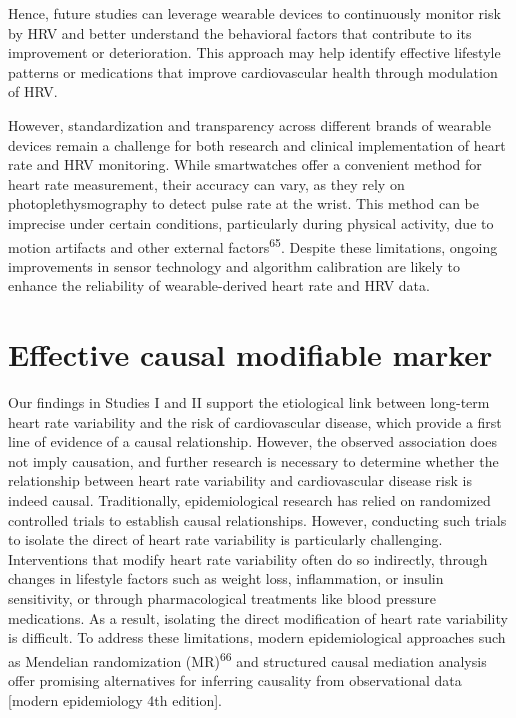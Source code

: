 \documentclass[
  a4paper,
  headsepline=true,
  open=any]{scrbook}
\begin{document}
Hence, future studies can leverage wearable devices to continuously
monitor risk by HRV and better understand the behavioral factors that
contribute to its improvement or deterioration. This approach may help
identify effective lifestyle patterns or medications that improve
cardiovascular health through modulation of HRV.

However, standardization and transparency across different brands of
wearable devices remain a challenge for both research and clinical
implementation of heart rate and HRV monitoring. While smartwatches
offer a convenient method for heart rate measurement, their accuracy can
vary, as they rely on photoplethysmography to detect pulse rate at the
wrist. This method can be imprecise under certain conditions,
particularly during physical activity, due to motion artifacts and other
external factors\textsuperscript{65}. Despite these limitations, ongoing
improvements in sensor technology and algorithm calibration are likely
to enhance the reliability of wearable-derived heart rate and HRV data.

\hypertarget{effective-causal-modifiable-marker}{%
\section{Effective causal modifiable
marker}\label{effective-causal-modifiable-marker}}

Our findings in Studies I and II support the etiological link between
long-term heart rate variability and the risk of cardiovascular disease,
which provide a first line of evidence of a causal relationship.
However, the observed association does not imply causation, and further
research is necessary to determine whether the relationship between
heart rate variability and cardiovascular disease risk is indeed causal.
Traditionally, epidemiological research has relied on randomized
controlled trials to establish causal relationships. However, conducting
such trials to isolate the direct of heart rate variability is
particularly challenging. Interventions that modify heart rate
variability often do so indirectly, through changes in lifestyle factors
such as weight loss, inflammation, or insulin sensitivity, or through
pharmacological treatments like blood pressure medications. As a result,
isolating the direct modification of heart rate variability is
difficult. To address these limitations, modern epidemiological
approaches such as Mendelian randomization (MR)\textsuperscript{66} and
structured causal mediation analysis offer promising alternatives for
inferring causality from observational data {[}modern epidemiology 4th
edition{]}.
\end{document}
